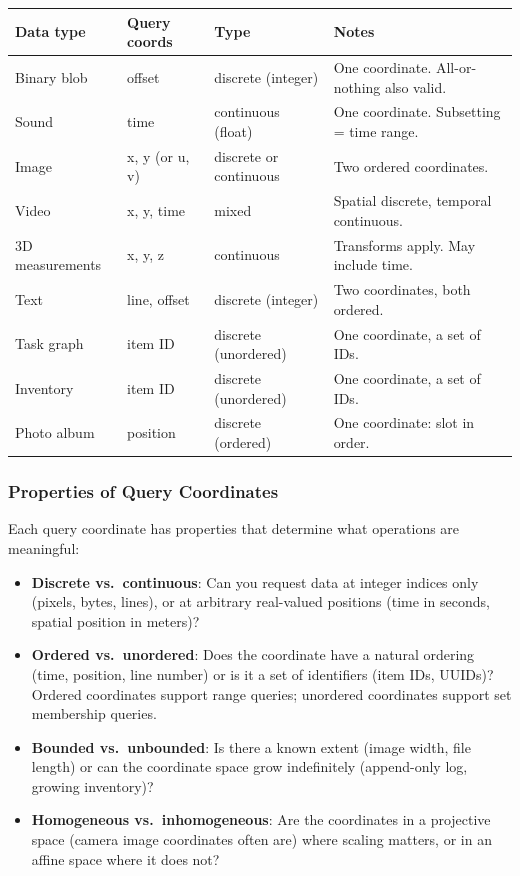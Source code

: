 \documentclass[11pt, letterpaper]{article}
\begin{document}
\begin{center}
\begin{tabularx}{\textwidth}{l l l X}
\toprule
\textbf{Data type} & \textbf{Query coords} & \textbf{Type} & \textbf{Notes} \\
\midrule
Binary blob & offset & discrete (integer) & One coordinate. All-or-nothing also valid. \\
Sound & time & continuous (float) & One coordinate. Subsetting = time range. \\
Image & x, y (or u, v) & discrete or continuous & Two ordered coordinates. \\
Video & x, y, time & mixed & Spatial discrete, temporal continuous. \\
3D measurements & x, y, z & continuous & Transforms apply. May include time. \\
Text & line, offset & discrete (integer) & Two coordinates, both ordered. \\
Task graph & item ID & discrete (unordered) & One coordinate, a set of IDs. \\
Inventory & item ID & discrete (unordered) & One coordinate, a set of IDs. \\
Photo album & position & discrete (ordered) & One coordinate: slot in order. \\
\bottomrule
\end{tabularx}
\end{center}

\subsubsection{Properties of Query Coordinates}

Each query coordinate has properties that determine what operations are meaningful:

\begin{itemize}[leftmargin=2em]
  \item \textbf{Discrete vs.\ continuous}: Can you request data at integer indices only
    (pixels, bytes, lines), or at arbitrary real-valued positions (time in seconds,
    spatial position in meters)?
  \item \textbf{Ordered vs.\ unordered}: Does the coordinate have a natural ordering
    (time, position, line number) or is it a set of identifiers (item IDs, UUIDs)?
    Ordered coordinates support range queries; unordered coordinates support set
    membership queries.
  \item \textbf{Bounded vs.\ unbounded}: Is there a known extent (image width, file
    length) or can the coordinate space grow indefinitely (append-only log, growing
    inventory)?
  \item \textbf{Homogeneous vs.\ inhomogeneous}: Are the coordinates in a projective
    space (camera image coordinates often are) where scaling matters, or in an affine
    space where it does not?
\end{itemize}
\end{document}
